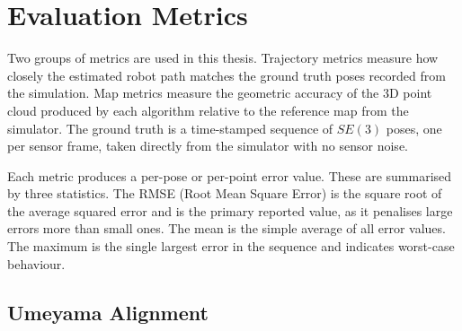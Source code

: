 \section{Evaluation Metrics}
\label{sec:eval_metrics}

Two groups of metrics are used in this thesis.
Trajectory metrics measure how closely the estimated robot path matches the
ground truth poses recorded from the simulation.
Map metrics measure the geometric accuracy of the 3D point cloud produced
by each algorithm relative to the reference map from the simulator.
The ground truth is a time-stamped sequence of $SE(3)$ poses, one per
sensor frame, taken directly from the simulator with no sensor noise.

Each metric produces a per-pose or per-point error value.
These are summarised by three statistics.
The RMSE (Root Mean Square Error) is the square root of the average squared
error and is the primary reported value, as it penalises large errors more
than small ones.
The mean is the simple average of all error values.
The maximum is the single largest error in the sequence and indicates
worst-case behaviour.

\subsection{Umeyama Alignment}

